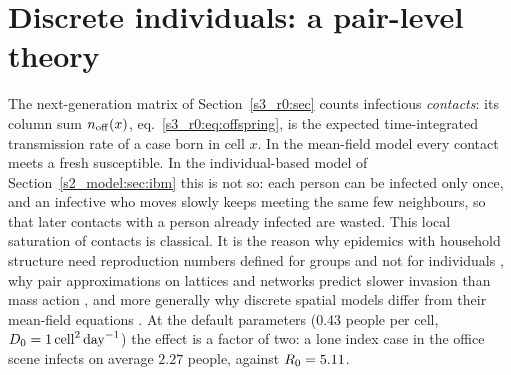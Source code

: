 \section{Discrete individuals: a pair-level theory}\label{s5_pair:sec}

The next-generation matrix of Section~\ref{s3_r0:sec} counts infectious \emph{contacts}: its column sum
$n_{\mathrm{off}}(x)$, eq.~\eqref{s3_r0:eq:offspring}, is the expected time-integrated transmission rate of a case born in
cell $x$. In the mean-field model every contact meets a fresh susceptible. In the individual-based model of
Section~\ref{s2_model:sec:ibm} this is not so: each person can be infected only once, and an infective who moves
slowly keeps meeting the same few neighbours, so that later contacts with a person already infected are
wasted. This local saturation of contacts is classical. It is the reason why epidemics with household
structure need reproduction numbers defined for groups and not for individuals \citep{ball1997epidemics},
why pair approximations on lattices and networks predict slower invasion than mass action
\citep{keeling1999effects}, and more generally why discrete spatial models differ from their mean-field
equations \citep{durrett1994importance}. At the default parameters (0.43 people per cell, $D_0=1\,\mathrm{cell}^2\,\mathrm{day}^{-1}$) the
effect is a factor of two: a lone index case in the office scene infects on average $2.27$ people, against
$R_0=5.11$.

